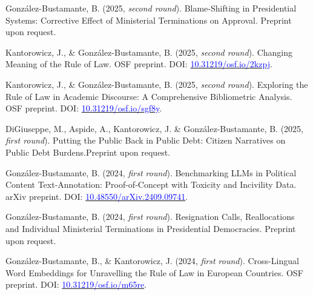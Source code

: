 \begin{publications}

\begin{benumerate}{8}

\item{González-Bustamante, B. (2025, {\itshape second round}). Blame-Shifting in Presidential Systems: Corrective Effect of Ministerial Terminations on Approval. Preprint upon request.}\vspace{1mm}

\item{Kantorowicz, J., \& González-Bustamante, B. (2025, {\itshape second round}). Changing Meaning of the Rule of Law. OSF preprint. DOI: \href{https://doi.org/10.31219/osf.io/2kzpj}{\textcolor{blue}{10.31219/osf.io/2kzpj}}.}\vspace{1mm}

\item{Kantorowicz, J., \& González-Bustamante, B. (2025, {\itshape second round}). Exploring the Rule of Law in Academic Discourse: A Comprehensive Bibliometric Analysis. OSF preprint. DOI: \href{https://doi.org/10.31219/osf.io/sgf8y}{\textcolor{blue}{10.31219/osf.io/sgf8y}}.}\vspace{1mm}

\item{DiGiuseppe, M., Aspide, A., Kantorowicz, J. \& González-Bustamante, B. (2025, {\itshape first round}). Putting the Public Back in Public Debt: Citizen Narratives on Public Debt Burdens.Preprint upon request.}\vspace{1mm}

\item{González-Bustamante, B. (2024, {\itshape first round}). Benchmarking LLMs in Political Content Text-Annotation: Proof-of-Concept with Toxicity and Incivility Data. arXiv preprint. DOI: \href{https://doi.org/10.48550/arXiv.2409.09741}{\textcolor{blue}{10.48550/arXiv.2409.09741}}.}\vspace{1mm}

\item{González-Bustamante, B. (2024, {\itshape first round}). Resignation Calls, Reallocations and Individual Ministerial Terminations in Presidential Democracies. Preprint upon request.}\vspace{1mm} %

\item{González-Bustamante, B., \& Kantorowicz, J. (2024, {\itshape first round}). Cross-Lingual Word Embeddings for Unravelling the Rule of Law in European Countries. OSF preprint. DOI: \href{https://doi.org/10.31219/osf.io/m65re}{\textcolor{blue}{10.31219/osf.io/m65re}}.}\vspace{1mm}


\end{benumerate}
\end{publications}

